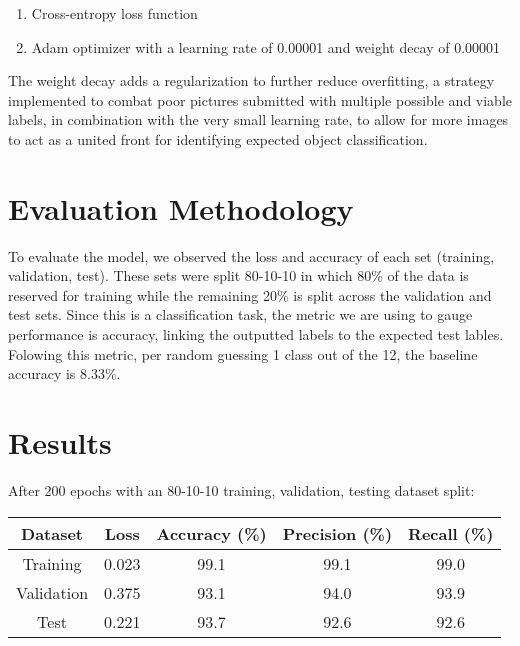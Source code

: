\documentclass[10pt]{article}
\begin{document}
\begin{enumerate}
\item Cross-entropy loss function
\item Adam optimizer with a learning rate of 0.00001 and weight decay of 0.00001
\end{enumerate}
The weight decay adds a regularization to further reduce overfitting, a strategy implemented to combat poor pictures submitted with multiple possible and viable labels, in combination with the very small learning rate, to allow for more images to act as a united front for identifying expected object classification.







\section{Evaluation Methodology}

\indent To evaluate the model, we observed the loss and accuracy of each set (training, validation, test). These sets were split 80-10-10 in which 80\% of the data is reserved for training while the remaining 20\% is split across the validation and test sets. Since this is a classification task, the metric we are using to gauge performance is accuracy, linking the outputted labels to the expected test lables. Folowing this metric, per random guessing 1 class out of the 12, the baseline accuracy is 8.33\%.




\section{Results}

\indent After 200 epochs with an 80-10-10 training, validation, testing dataset split:
 
\begin{center}
\begin{tabular}{|c c c c c|} 
 \hline
 Dataset & Loss & Accuracy (\%) & Precision (\%) & Recall (\%) \\ 
 \hline
 Training & 0.023 & 99.1 & 99.1 & 99.0 \\ 
 \hline
 Validation & 0.375 & 93.1 & 94.0 & 93.9 \\ 
 \hline
 Test & 0.221 & 93.7 & 92.6 & 92.6 \\ 
\hline
\end{tabular}
\end{center}
\end{document}
